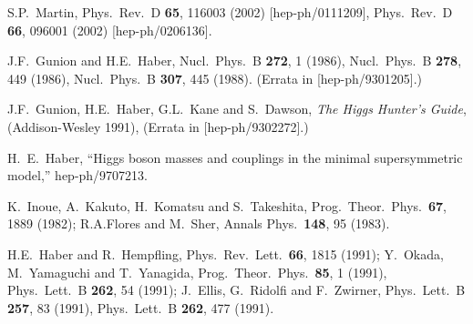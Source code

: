 \documentclass[11pt]{article}
\begin{document}
\begin{thebibliography}{999}
S.P.~Martin,
  Phys.\ Rev.\ D {\bf 65}, 116003 (2002)
  [hep-ph/0111209],
  Phys.\ Rev.\ D {\bf 66}, 096001 (2002)
  [hep-ph/0206136].
  
J.F.~Gunion and H.E.~Haber,
  Nucl.\ Phys.\ B {\bf 272}, 1 (1986),
  Nucl.\ Phys.\ B {\bf 278}, 449 (1986),
  Nucl.\ Phys.\ B {\bf 307}, 445 (1988).
  (Errata in [hep-ph/9301205].)

J.F.~Gunion, H.E.~Haber, G.L.~Kane and S.~Dawson,
  {\em The Higgs Hunter's Guide}, (Addison-Wesley 1991),  
  (Errata in [hep-ph/9302272].)

  H.~E.~Haber,
  ``Higgs boson masses and couplings in the minimal supersymmetric model,''
  hep-ph/9707213.

K.~Inoue, A.~Kakuto, H.~Komatsu and S.~Takeshita,
  Prog.\ Theor.\ Phys.\  {\bf 67}, 1889 (1982);
R.A.Flores and M.~Sher, 
  Annals Phys.\  {\bf 148}, 95 (1983).

H.E.~Haber and R.~Hempfling, 
  Phys.\ Rev.\ Lett.\  {\bf 66}, 1815 (1991);
Y.~Okada, M.~Yamaguchi and T.~Yanagida,
  Prog.\ Theor.\ Phys.\  {\bf 85}, 1 (1991),
  Phys.\ Lett.\ B {\bf 262}, 54 (1991);
J.~Ellis, G.~Ridolfi and F.~Zwirner,
  Phys.\ Lett.\ B {\bf 257}, 83 (1991),
  Phys.\ Lett.\ B {\bf 262}, 477 (1991).


\end{thebibliography}
\end{document}
